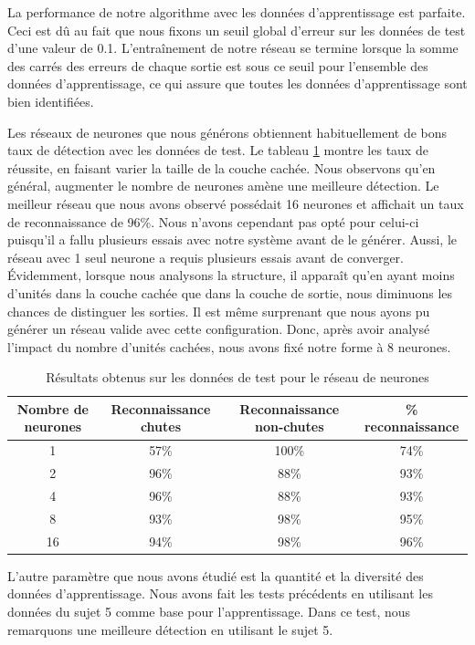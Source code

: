 \documentclass[12pt,letterpaper]{article}
\begin{document}
La performance de notre algorithme avec les données d'apprentissage est parfaite. Ceci est dû au fait que nous fixons un seuil global d'erreur sur les données de test d'une valeur de 0.1. L'entraînement de notre réseau se termine lorsque la somme des carrés des erreurs de chaque sortie est sous ce seuil pour l'ensemble des données d'apprentissage, ce qui assure que toutes les données d'apprentissage sont bien identifiées.

Les réseaux de neurones que nous générons obtiennent habituellement de bons taux de détection avec les données de test. Le tableau \ref{tbl:neural_results} montre les taux de réussite, en faisant varier la taille de la couche cachée. Nous observons qu'en général, augmenter le nombre de neurones amène une meilleure détection. Le meilleur réseau que nous avons observé possédait 16 neurones et affichait un taux de reconnaissance de 96\%. Nous n'avons cependant pas opté pour celui-ci puisqu'il a fallu plusieurs essais avec notre système avant de le générer. Aussi, le réseau avec 1 seul neurone a requis plusieurs essais avant de converger. Évidemment, lorsque nous analysons la structure, il apparaît qu'en ayant moins d'unités dans la couche cachée que dans la couche de sortie, nous diminuons les chances de distinguer les sorties. Il est même surprenant que nous ayons pu générer un réseau valide avec cette configuration. Donc, après avoir analysé l'impact du nombre d'unités cachées, nous avons fixé notre forme à 8 neurones.
\begin{table}
\centering
\begin{tabular}{|c|c|c|c|}
    \hline
    Nombre de neurones & Reconnaissance chutes & Reconnaissance non-chutes & \% reconnaissance \\ \hline
    1 & 57\% & 100\% & 74\%  \\ \hline
    2 & 96\%  & 88\% & 93\% \\ \hline
    4 & 96\% & 88\% & 93\% \\ \hline
    8 & 93\% & 98\% & 95\% \\ \hline
    16 & 94\% & 98\% & 96\% \\ \hline
\end{tabular}
\caption{Résultats obtenus sur les données de test pour le réseau de neurones}
\label{tbl:neural_results}
\end{table}

L'autre paramètre que nous avons étudié est la quantité et la diversité des données d'apprentissage. Nous avons fait les tests précédents en utilisant les données du sujet 5 comme base pour l'apprentissage. Dans ce test, nous remarquons une meilleure détection en utilisant le sujet 5.
\end{document}
